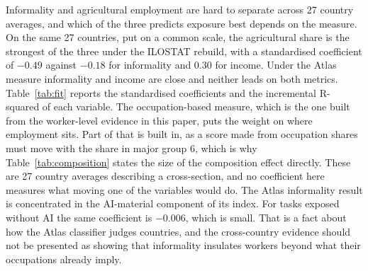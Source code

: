 Informality and agricultural
employment are hard to separate across 27 country averages, and which of the
three predicts exposure best depends on the measure. On the same 27 countries,
put on a common scale, the agricultural share is the strongest of the three
under the ILOSTAT rebuild, with a standardised coefficient of $-0.49$ against
$-0.18$ for informality and 0.30 for income. Under the Atlas measure informality
and income are close and neither leads on both metrics.
Table~\ref{tab:fit} reports the standardised coefficients and the incremental
R-squared of each variable. The occupation-based measure, which is the
one built from the worker-level evidence in this paper, puts the weight on where
employment sits. Part of that is built in, as a score made from occupation
shares must move with the share in major group 6, which is why
Table~\ref{tab:composition} states the size of the composition effect directly.
These are 27 country averages describing a cross-section, and no coefficient
here measures what moving one of the variables would do. The Atlas informality
result is concentrated in the AI-material component of its index. For tasks
exposed without AI the same coefficient is $-0.006$, which is small. 
That is a fact about how the Atlas
classifier judges countries, and the cross-country evidence should not be
presented as showing that informality insulates workers beyond what their
occupations already imply.

